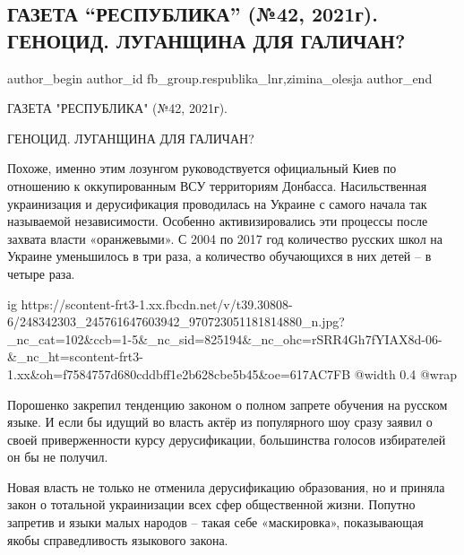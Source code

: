  
 
 
 
 
 
\subsection{ГАЗЕТА \enquote{РЕСПУБЛИКА} (№42, 2021г). ГЕНОЦИД. ЛУГАНЩИНА ДЛЯ ГАЛИЧАН?}
\label{sec:25_10_2021.fb.fb_group.respublika_lnr.1.genocid_ukrainizacia_galichane}
 
\ifcmt
 author_begin
   author_id fb_group.respublika_lnr,zimina_olesja
 author_end
\fi

ГАЗЕТА "РЕСПУБЛИКА" (№42, 2021г).

ГЕНОЦИД. ЛУГАНЩИНА ДЛЯ ГАЛИЧАН?

Похоже, именно этим лозунгом руководствуется официальный Киев по отношению к
оккупированным ВСУ территориям Донбасса. Насильственная украинизация и
дерусификация проводилась на Украине с самого начала так называемой
независимости. Особенно активизировались эти процессы после захвата власти
«оранжевыми». С 2004 по 2017 год количество русских школ на Украине уменьшилось
в три раза, а количество обучающихся в них детей – в четыре раза.

\ifcmt
  ig https://scontent-frt3-1.xx.fbcdn.net/v/t39.30808-6/248342303_245761647603942_970723051181814880_n.jpg?_nc_cat=102&ccb=1-5&_nc_sid=825194&_nc_ohc=rSRR4Gh7fYIAX8d-06-&_nc_ht=scontent-frt3-1.xx&oh=f7584757d680cddbff1e2b628cbe5b45&oe=617AC7FB
  @width 0.4
  @wrap 
\fi

Порошенко закрепил тенденцию законом о полном запрете обучения на русском
языке. И если бы идущий во власть актёр из популярного шоу сразу заявил о своей
приверженности курсу дерусификации, большинства голосов избирателей он бы не
получил. 

Новая власть не только не отменила дерусификацию образования, но и приняла
закон о тотальной украинизации всех сфер общественной жизни. Попутно запретив и
языки малых народов – такая себе «маскировка», показывающая якобы
справедливость языкового закона. 

